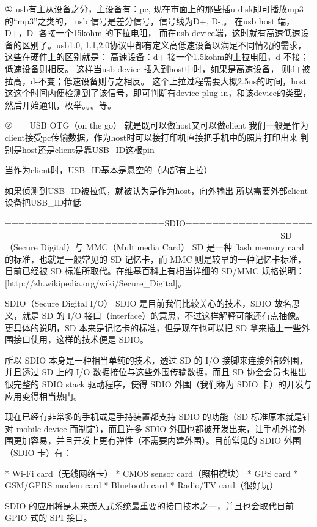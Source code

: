 \documentclass{book}
\begin{document}
\begin{CJK}{UTF8}{gbsn}
{{{{{①  usb有主从设备之分，主设备有：pc, 现在市面上的那些插u-disk即可播放mp3的“mp3”之类的，
usb 信号是差分信号，信号线为D+, D-,。 在usb host 端， D+，D- 各接一个15kohm 的下拉电阻， 而在usb device端，这时就有高速低速设备的区别了。usb1.0, 1.1,2.0协议中都有定义高低速设备以满足不同情况的需求，这些在硬件上的区别就是： 高速设备：d+ 接一个1.5kohm的上拉电阻，d-不接；低速设备则相反。
      这样当usb device 插入到host中时，如果是高速设备， 则d+被拉高，d-不变；低速设备则与之相反。 这个上拉过程需要大概2.5us的时间，host这这个时间内便检测到了该信号，即可判断有device plug in，和该device的类型，然后开始通讯，枚举。。。等。

②　　USB OTG（on the go） 就是既可以做host又可以做client
我们一般是作为client接受pc传输数据，作为host时可以接打印机直接把手机中的照片打印出来
判别是host还是client是靠USB_ID这根pin

当作为client时，USB_ID基本是悬空的（内部有上拉）

如果侦测到USB_ID被拉低，就被认为是作为host，向外输出
所以需要外部client设备把USB_ID拉低

========================SDIO============================================================
SD（Secure Digital）与 MMC（Multimedia Card）
SD 是一种 flash memory card 的标准，也就是一般常见的 SD 记忆卡，而 MMC 则是较早的一种记忆卡标准，目前已经被 SD 标准所取代。在维基百科上有相当详细的 SD/MMC 规格说明：[http://zh.wikipedia.org/wiki/Secure_Digital]。

SDIO（Secure Digital I/O）
SDIO 是目前我们比较关心的技术，SDIO 故名思义，就是 SD 的 I/O 接口（interface）的意思，不过这样解释可能还有点抽像。更具体的说明，SD 本来是记忆卡的标准，但是现在也可以把 SD 拿来插上一些外围接口使用，这样的技术便是 SDIO。

所以 SDIO 本身是一种相当单纯的技术，透过 SD 的 I/O 接脚来连接外部外围，并且透过 SD 上的 I/O 数据接位与这些外围传输数据，而且 SD 协会会员也推出很完整的 SDIO stack 驱动程序，使得 SDIO 外围（我们称为 SDIO 卡）的开发与应用变得相当热门。

现在已经有非常多的手机或是手持装置都支持 SDIO 的功能（SD 标准原本就是针对 mobile device 而制定），而且许多 SDIO 外围也都被开发出来，让手机外接外围更加容易，并且开发上更有弹性（不需要内建外围）。目前常见的 SDIO 外围（SDIO 卡）有：

    * Wi-Fi card（无线网络卡）
    * CMOS sensor card（照相模块）
    * GPS card
    * GSM/GPRS modem card
    * Bluetooth card
    * Radio/TV card（很好玩）

SDIO 的应用将是未来嵌入式系统最重要的接口技术之一，并且也会取代目前 GPIO 式的 SPI 接口。

}}}}}
\end{CJK}
\end{document}
